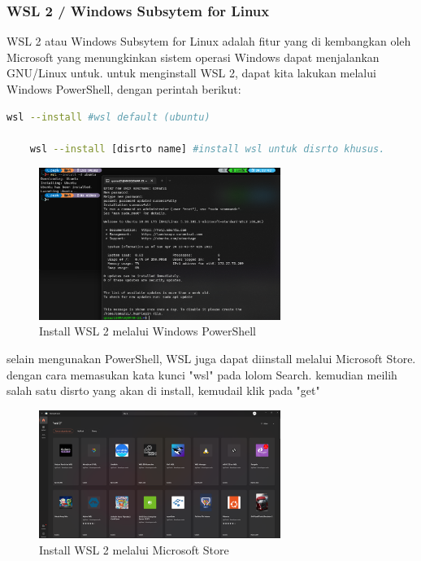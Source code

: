 \documentclass[11pt,a4paper]{article}
\begin{document}
\subsubsection*{WSL 2 / Windows Subsytem for Linux}
WSL 2 atau Windows Subsytem for Linux adalah fitur yang di kembangkan oleh Microsoft yang menungkinkan 
sistem operasi Windows dapat menjalankan GNU/Linux untuk. untuk menginstall WSL 2, dapat kita lakukan melalui Windows PowerShell, dengan 
perintah berikut:
\begin{lstlisting}[language=bash]
	wsl --install #wsl default (ubuntu)

	wsl --install [disrto name] #install wsl untuk disrto khusus.
\end{lstlisting}
\begin{figure}[h]
\centering
\includegraphics[width=0.7\textwidth]{Figure/asset/install wsl ubuntu.png}
\caption{Install WSL 2 melalui Windows PowerShell}
\end{figure}
selain mengunakan PowerShell, WSL juga dapat diinstall melalui Microsoft Store. dengan cara memasukan kata kunci "wsl" pada lolom Search. kemudian
meilih salah satu disrto yang akan di install, kemudail klik pada "get"
\begin{figure}[h]
\centering
\includegraphics[width=0.7\textwidth]{Figure/asset/wsl from microsoft store.png}
\caption{Install WSL 2 melalui Microsoft Store}
\end{figure}
\end{document}
